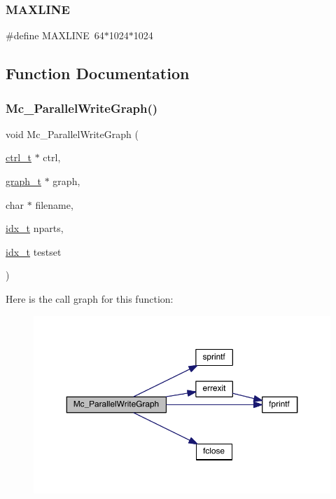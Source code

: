 \subsubsection{\texorpdfstring{M\+A\+X\+L\+I\+NE}{MAXLINE}}
{\footnotesize\ttfamily \#define M\+A\+X\+L\+I\+NE~64$\ast$1024$\ast$1024}



\subsection{Function Documentation}
\mbox{\label{a00861_a13a98ce22f397ea58e35b30ea012a6a0}} 
\subsubsection{\texorpdfstring{Mc\+\_\+\+Parallel\+Write\+Graph()}{Mc\_ParallelWriteGraph()}}
{\footnotesize\ttfamily void Mc\+\_\+\+Parallel\+Write\+Graph (\begin{DoxyParamCaption}\item[{\hyperlink{a00742}{ctrl\+\_\+t} $\ast$}]{ctrl,  }\item[{\hyperlink{a00734}{graph\+\_\+t} $\ast$}]{graph,  }\item[{char $\ast$}]{filename,  }\item[{\hyperlink{a00876_aaa5262be3e700770163401acb0150f52}{idx\+\_\+t}}]{nparts,  }\item[{\hyperlink{a00876_aaa5262be3e700770163401acb0150f52}{idx\+\_\+t}}]{testset }\end{DoxyParamCaption})}

Here is the call graph for this function\+:\nopagebreak
\begin{figure}[H]
\begin{center}
\leavevmode
\includegraphics[width=350pt]{a00861_a13a98ce22f397ea58e35b30ea012a6a0_cgraph}
\end{center}
\end{figure}
\mbox{\label{a00861_a51cf512b2713a4b6397016836e9e653e}} 
